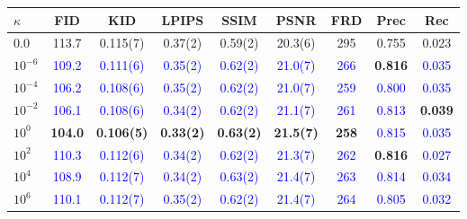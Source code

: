 \documentclass[twoside,11pt]{article}
\begin{document}
\begin{table}[ht!]
\centering
\renewcommand{\arraystretch}{1.4}
\setlength{\tabcolsep}{6pt}
\small
\begin{tabular}{lcccccccc}
\toprule
\rowcolor{gray!20}
\textbf{$\kappa$} & \textbf{FID} & \textbf{KID} & \textbf{LPIPS} & \textbf{SSIM} & \textbf{PSNR} & \textbf{FRD} & \textbf{Prec} & \textbf{Rec} \\
\midrule
$0.0$        & 113.7 & 0.115(7) & 0.37(2) & 0.59(2) & 20.3(6) & 295 & 0.755 & 0.023 \\
$10^{-6}$    & \textcolor{blue}{109.2} & \textcolor{blue}{0.111(6)} & \textcolor{blue}{0.35(2)} & \textcolor{blue}{0.62(2)} & \textcolor{blue}{21.0(7)} & \textcolor{blue}{266} & \textbf{\textcolor{green!50!black}{0.816}} & \textcolor{blue}{0.035} \\
$10^{-4}$    & \textcolor{blue}{106.2} & \textcolor{blue}{0.108(6)} & \textcolor{blue}{0.35(2)} & \textcolor{blue}{0.62(2)} & \textcolor{blue}{21.0(7)} & \textcolor{blue}{259} & \textcolor{blue}{0.800} & \textcolor{blue}{0.035} \\
$10^{-2}$    & \textcolor{blue}{106.1} & \textcolor{blue}{0.108(6)} & \textcolor{blue}{0.34(2)} & \textcolor{blue}{0.62(2)} & \textcolor{blue}{21.1(7)} & \textcolor{blue}{261} & \textcolor{blue}{0.813} & \textbf{\textcolor{green!50!black}{0.039}} \\
$10^{0}$     & \textbf{\textcolor{green!50!black}{104.0}} & \textbf{\textcolor{green!50!black}{0.106(5)}} & \textbf{\textcolor{green!50!black}{0.33(2)}} & \textbf{\textcolor{green!50!black}{0.63(2)}} & \textbf{\textcolor{green!50!black}{21.5(7)}} & \textbf{\textcolor{green!50!black}{258}} & \textcolor{blue}{0.815} & \textcolor{blue}{0.035} \\
$10^{2}$     & \textcolor{blue}{110.3} & \textcolor{blue}{0.112(6)} & \textcolor{blue}{0.34(2)} & \textcolor{blue}{0.62(2)} & \textcolor{blue}{21.3(7)} & \textcolor{blue}{262} & \textbf{\textcolor{green!50!black}{0.816}} & \textcolor{blue}{0.027} \\
$10^{4}$     & \textcolor{blue}{108.9} & \textcolor{blue}{0.112(7)} & \textcolor{blue}{0.34(2)} & \textcolor{blue}{0.63(2)} & \textcolor{blue}{21.4(7)} & \textcolor{blue}{263} & \textcolor{blue}{0.814} & \textcolor{blue}{0.034} \\
$10^{6}$     & \textcolor{blue}{110.1} & \textcolor{blue}{0.112(7)} & \textcolor{blue}{0.35(2)} & \textcolor{blue}{0.62(2)} & \textcolor{blue}{21.4(7)} & \textcolor{blue}{264} & \textcolor{blue}{0.805} & \textcolor{blue}{0.032} \\

\end{tabular}
\end{table}
\end{document}
